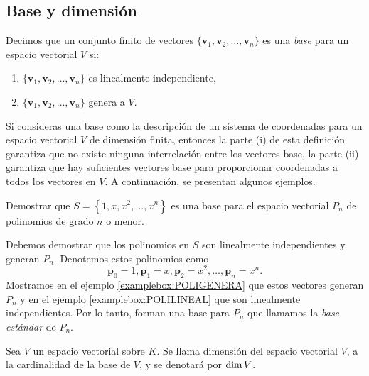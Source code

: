 
\newpage

\subsection{Base y dimensión}

\begin{definicion}{}{}
    Decimos que un conjunto finito de vectores $\{ \mathbf{v}_1, \mathbf{v}_2, \dots, \mathbf{v}_n \}$ es una \emph{base} para un espacio vectorial $V$ si:
    \begin{enumerate}[label=\roman*), topsep=6pt, itemsep=0pt]
        \item $\{ \mathbf{v}_1, \mathbf{v}_2, \dots, \mathbf{v}_n \}$ es linealmente independiente,
        \item $\{ \mathbf{v}_1, \mathbf{v}_2, \dots, \mathbf{v}_n \}$ genera a $V$.
    \end{enumerate}
\end{definicion}

Si consideras una base como la descripción de un sistema de coordenadas para un espacio vectorial $V$ de dimensión finita, entonces la parte (i) de esta definición garantiza que no existe ninguna interrelación entre los vectores base, la parte (ii) garantiza que hay suficientes vectores base para proporcionar coordenadas a todos los vectores en $V$. A continuación, se presentan algunos ejemplos.

\begin{examplebox}{}{}
    Demostrar que $S = \left\{1, x, x^2, \dots, x^n\right\}$ es una base para el espacio vectorial $P_n$ de polinomios de grado $n$ o menor.
    
    \tcblower
    \solucion Debemos demostrar que los polinomios en $S$ son linealmente independientes y generan $P_n$. Denotemos estos polinomios como
    $$\mathbf{p}_0 = 1, \mathbf{p}_1 = x, \mathbf{p}_2 = x^2, \dots, \mathbf{p}_n = x^n.$$
    Mostramos en el ejemplo \ref{examplebox:POLIGENERA} que estos vectores generan $P_n$ y en el ejemplo \ref{examplebox:POLILINEAL} que son linealmente independientes. Por lo tanto, forman una base para $P_n$ que llamamos la \emph{base estándar} de $P_n$.
\end{examplebox}

\begin{definicion}{}{}
    Sea $V$ un espacio vectorial sobre $K$. Se llama dimensión del espacio vectorial $V$, a la cardinalidad de la base de $V$, y se denotará por $\operatorname{dim} V$.
\end{definicion}

